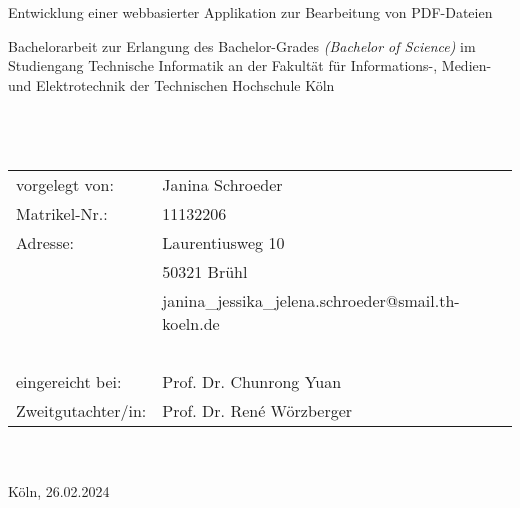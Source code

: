 \begin{titlepage}
	\begin{center}
	\end{center}

	\begin{huge}
		\noindent
		
		Entwicklung einer webbasierter Applikation zur \newline Bearbeitung von PDF-Dateien\\
	\end{huge}
	Bachelorarbeit zur Erlangung des Bachelor-Grades \newline
	\textit{(Bachelor of Science)} im Studiengang Technische Informatik \newline
	an der Fakultät für  Informations-, Medien- und Elektrotechnik \newline
	der Technischen Hochschule Köln \\
	~\\
	~\\
	~\\
	\noindent\begin{tabular}{ll}
		vorgelegt von: & Janina Schroeder \\
		Matrikel-Nr.: &	11132206 \\
		Adresse: & Laurentiusweg 10 \\
		~ &	50321 Brühl \\
		~ &	janina\_jessika\_jelena.schroeder@smail.th-koeln.de \\
		~ & ~ \\
		eingereicht bei: & Prof. Dr. Chunrong Yuan \\
		Zweitgutachter/in: & Prof. Dr. René Wörzberger
	\end{tabular}	
	~\\
	~\\
	Köln, 26.02.2024
\end{titlepage}